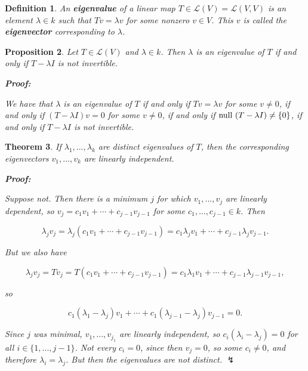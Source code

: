 \documentclass{article}
\theoremstyle{colontheorem}
\newtheorem{theorem}{Theorem}[section]
\newtheorem{proposition}[theorem]{Proposition}
\newtheorem{definition}[theorem]{Definition}
\newcommand{\Null}{\textnormal{null }}
\newenvironment{Theorem}
{
	\begin{mdframed}[backgroundcolor=TheoremOrange!10]
	\begin{theorem}
}
{
	\end{theorem}
	\end{mdframed}
	
	\vspace{.15in}
}
\newenvironment{Proposition}
{
	\begin{mdframed}[backgroundcolor=TheoremOrange!10]
	\begin{proposition}
}
{
	\end{proposition}
	\end{mdframed}
	
	\vspace{.15in}
}
\newenvironment{Def}
{
	\begin{mdframed}[backgroundcolor=DefGreen!10]
	\begin{definition}
}
{
	\end{definition}
	\end{mdframed}
	
	\vspace{.15in}
}
\newenvironment{Proof}
{
	\begin{mdframed}[backgroundcolor=ProofPurple!10]
	\textbf{Proof:}%
}
{
	\end{mdframed}
	
	\vspace{.085in}
}
\begin{document}
\begin{Def}
	
	An \textbf{eigenvalue} of a linear map $T \in \mathcal{L}(V) = \mathcal{L}(V,V)$ is an element $\lambda \in k$ such that $Tv = \lambda v$ for some nonzero $v \in V$. This $v$ is called the \textbf{eigenvector} corresponding to $\lambda$.
	
\end{Def}



\begin{Proposition}
	
	Let $T \in \mathcal{L}(V)$ and $\lambda \in k$. Then $\lambda$ is an eigenvalue of $T$ if and only if $T - \lambda I$ is not invertible.
	
	\begin{Proof}
		We have that $\lambda$ is an eigenvalue of $T$ if and only if $Tv = \lambda v$ for some $v \neq 0$, if and only if $(T - \lambda I)v = 0$ for some $v \neq 0$, if and only if $\Null (T - \lambda I) \neq \{0\}$, if and only if $T - \lambda I$ is not invertible.
		
	\end{Proof}
	
\end{Proposition}



\begin{Theorem}
	
	If $\lambda_1, ..., \lambda_k$ are distinct eigenvalues of $T$, then the corresponding eigenvectors $v_1, ..., v_k$ are linearly independent.
	
	\begin{Proof}
		Suppose not. Then there is a minimum $j$ for which $v_1, ..., v_j$ are linearly dependent, so $v_j = c_1 v_1 + \cdots + c_{j-1} v_{j-1}$ for some $c_1, ..., c_{j-1} \in k$. Then
		
		$$
			\lambda_j v_j = \lambda_j (c_1 v_1 + \cdots + c_{j-1} v_{j-1}) = c_1 \lambda_j v_1 + \cdots + c_{j-1} \lambda_j v_{j-1}.
		$$
		
		But we also have
		
		$$
			\lambda_j v_j = Tv_j = T(c_1 v_1 + \cdots + c_{j-1} v_{j-1}) = c_1 \lambda_1 v_1 + \cdots + c_{j-1} \lambda_{j-1} v_{j-1},
		$$
		
		so
		
		$$
			c_1(\lambda_1 - \lambda_j)v_1 + \cdots + c_1(\lambda_{j-1} - \lambda_j)v_{j-1} = 0.
		$$
		
		Since $j$ was minimal, $v_1, ..., v_{j_1}$ are linearly independent, so $c_i(\lambda_i - \lambda_j) = 0$ for all $i \in \{1, ..., j-1\}$. Not every $c_i = 0$, since then $v_j = 0$, so some $c_i \neq 0$, and therefore $\lambda_i = \lambda_j$. But then the eigenvalues are not distinct. $\lightning$
		
	\end{Proof}
	
\end{Theorem}
\end{document}
